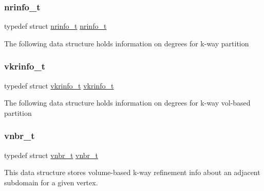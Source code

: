 \subsubsection{\texorpdfstring{nrinfo\+\_\+t}{nrinfo\_t}}
{\footnotesize\ttfamily typedef struct \hyperlink{a00730}{nrinfo\+\_\+t}  \hyperlink{a00730}{nrinfo\+\_\+t}}

The following data structure holds information on degrees for k-\/way partition \mbox{\label{a00972_a36303ec5e44c9bef2517d02061d79652}} 
\subsubsection{\texorpdfstring{vkrinfo\+\_\+t}{vkrinfo\_t}}
{\footnotesize\ttfamily typedef struct \hyperlink{a00726}{vkrinfo\+\_\+t}  \hyperlink{a00726}{vkrinfo\+\_\+t}}

The following data structure holds information on degrees for k-\/way vol-\/based partition \mbox{\label{a00972_a7c68d3021d30e50becb4136076530ed7}} 
\subsubsection{\texorpdfstring{vnbr\+\_\+t}{vnbr\_t}}
{\footnotesize\ttfamily typedef struct \hyperlink{a00722}{vnbr\+\_\+t}  \hyperlink{a00722}{vnbr\+\_\+t}}

This data structure stores volume-\/based k-\/way refinement info about an adjacent subdomain for a given vertex. 